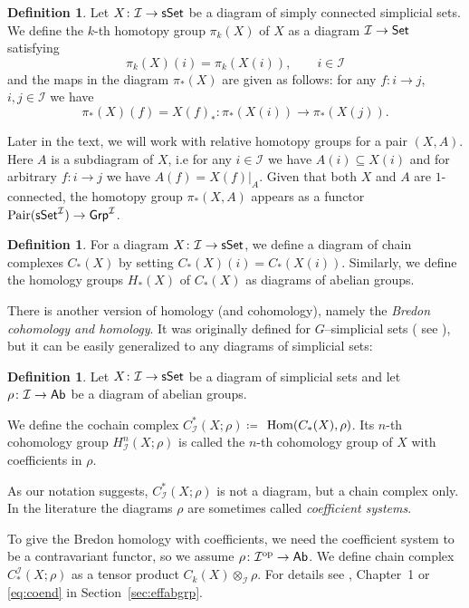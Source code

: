 \documentclass[12pt,a4wide]{article}
\theoremstyle{plain}
\theoremstyle{definition}
\newtheorem{Def}[thm]{Definition}
\newcommand{\Grp}{\mathsf{Grp}}
\newcommand{\OgsSet}{[{\mathcal{O}_G ^\mathsf{op}},{\mathsf{sSet}}]}
\newcommand{\thedimm}{{k}}
\renewcommand\:{\colon}
\newcommand{\dX}{X}
\newcommand{\dA}{A}
\newcommand{\dpi}{\pi}
\newcommand{\drho}{\rho}
\newcommand{\dC}{{C}}
\newcommand{\dH}{H}
\newcommand{\icat}{\mathcal I}
\begin{document}
\begin{Def}
Let  $\dX \colon \icat \to \sSet$ be a diagram of simply connected simplicial sets. We define the $\thedimm$-th  homotopy group $\dpi_\thedimm (\dX) $ of $\dX$ as a diagram $\icat \to \Set$ satisfying
\[
\dpi_\thedimm (\dX) (i) = \pi_\thedimm (\dX(i)), \qquad i\in \icat
\]
and the maps in the diagram $\dpi_* (\dX)$ are given as follows: for any $f\: i\to j$, $i,j \in \icat$ we have 
\[
\dpi_* (\dX) (f) = \dX(f)_* \:  \pi_* (\dX(i)) \to  \pi_* (\dX(j)).
\]
\end{Def}
Later in the text, we will work with relative homotopy groups for a pair $(\dX, \dA)$. Here $\dA$ is a subdiagram of $\dX$, i.e for any $i\in \icat$ we have $\dA (i) \subseteq \dX (i)$ and for arbitrary $f\: i \to j$ we have $\dA(f) = \dX(f)|_{\dA}$. Given that both $\dX$ and $\dA$ are $1$-connected, the homotopy group $\dpi_*(\dX, \dA)$ appears as a functor $\mathrm{Pair}( \sSet^\icat) \to \Grp^\icat$.

\begin{Def}
For a diagram $\dX\: \icat \to \sSet$, we define a diagram of chain complexes $\dC_*(\dX)$ by setting $\dC_*(\dX)(i) = C_*(\dX(i))$. Similarly, we define the homology groups $\dH_* (\dX)$ of $\dC_*(\dX)$ as diagrams of abelian groups.
\end{Def}
There is another version of homology (and cohomology), namely the \emph{Bredon cohomology and homology}. It was originally defined for $G$--simplicial sets (
see \cite{bredon}), but it can be easily generalized to any diagrams of simplicial sets:
\begin{Def}\label{def:Bredon}
Let $\dX \colon \icat \to \sSet$ be a diagram of simplicial sets and let $\drho\colon \icat \to \Ab$ be a diagram of abelian groups. 

We define the cochain complex $C^* _\icat (\dX;\drho) \coloneqq$ $\Hom(\dC_*( \dX), \drho)$. Its $n$-th cohomology group $H^n _\icat (\dX; \drho)$ is called the $n$-th cohomology group of $\dX$ with coefficients in $\drho$.
\end{Def}
As our notation suggests,  $C^* _\icat(\dX;\drho)$ is not a diagram, but a chain complex only. In the literature \cite{alaska, bredon} the diagrams $\drho$ are sometimes called \emph{coefficient systems}.

To give the Bredon homology with coefficients, we need the coefficient system to be a contravariant functor, so we assume $\drho \: \icat^\op \to \Ab$. We define chain complex $C_* ^\icat (\dX;\drho)$ as a tensor product $\dC_\thedimm(\dX) \otimes_\icat \drho$. For details see \cite{alaska}, Chapter~1 or \eqref{eq:coend} in Section~\ref{sec:effabgrp}.
\end{document}
